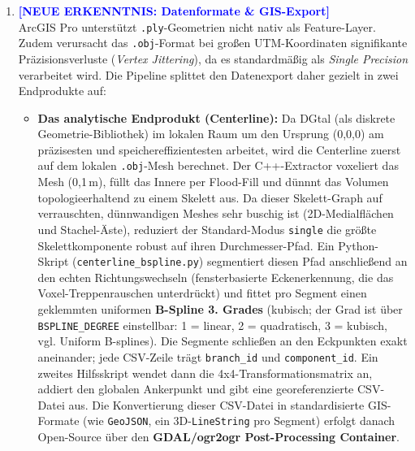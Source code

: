 \documentclass[12pt,a4paper]{article}
\begin{document}
\begin{enumerate}
          SuGaR berechnet danach parallel das rohe, lokale 3D-Mesh. Anstatt jedoch das rechenintensive Millionen-Polygon-Mesh in globale Koordinaten zu überführen, wird zunächst DGtal auf dem lokalen Mesh ausgeführt. Die resultierende lokale Centerline (bestehend aus wenigen hundert Punkten) wird in Container E über ein kurzes Python-Hilfsskript mittels der 4x4-Transformationsmatrix multipliziert, um die Rotation und Skalierung anzuwenden, und danach durch Addition des Anker-GCPs in die globalen UTM-Koordinaten überführt.

    \item \textcolor{blue}{\textbf{[NEUE ERKENNTNIS: Datenformate \& GIS-Export]}} \\
          ArcGIS Pro unterstützt \texttt{.ply}-Geometrien nicht nativ als Feature-Layer. Zudem verursacht das \texttt{.obj}-Format bei großen UTM-Koordinaten signifikante Präzisionsverluste (\textit{Vertex Jittering}), da es standardmäßig als \textit{Single Precision} verarbeitet wird. Die Pipeline splittet den Datenexport daher gezielt in zwei Endprodukte auf:
          \begin{itemize}
              \item \textbf{Das analytische Endprodukt (Centerline):} Da DGtal (als diskrete Geometrie-Bibliothek) im lokalen Raum um den Ursprung (0,0,0) am präzisesten und speichereffizientesten arbeitet, wird die Centerline zuerst auf dem lokalen \texttt{.obj}-Mesh berechnet. Der C++-Extractor voxeliert das Mesh (0,1\,m), füllt das Innere per Flood-Fill und dünnnt das Volumen topologieerhaltend zu einem Skelett aus. Da dieser Skelett-Graph auf verrauschten, dünnwandigen Meshes sehr buschig ist (2D-Medialflächen und Stachel-Äste), reduziert der Standard-Modus \texttt{single} die größte Skelettkomponente robust auf ihren Durchmesser-Pfad. Ein Python-Skript (\texttt{centerline\_bspline.py}) segmentiert diesen Pfad anschließend an den echten Richtungswechseln (fensterbasierte Eckenerkennung, die das Voxel-Treppenrauschen unterdrückt) und fittet pro Segment einen geklemmten uniformen \textbf{B-Spline 3. Grades} (kubisch; der Grad ist über \texttt{BSPLINE\_DEGREE} einstellbar: 1 = linear, 2 = quadratisch, 3 = kubisch, vgl. Uniform B-splines). Die Segmente schließen an den Eckpunkten exakt aneinander; jede CSV-Zeile trägt \texttt{branch\_id} und \texttt{component\_id}. Ein zweites Hilfsskript wendet dann die 4x4-Transformationsmatrix an, addiert den globalen Ankerpunkt und gibt eine georeferenzierte CSV-Datei aus. Die Konvertierung dieser CSV-Datei in standardisierte GIS-Formate (wie \texttt{GeoJSON}, ein 3D-\texttt{LineString} pro Segment) erfolgt danach Open-Source über den \textbf{GDAL/ogr2ogr Post-Processing Container}.

\end{itemize}
\end{enumerate}
\end{document}
